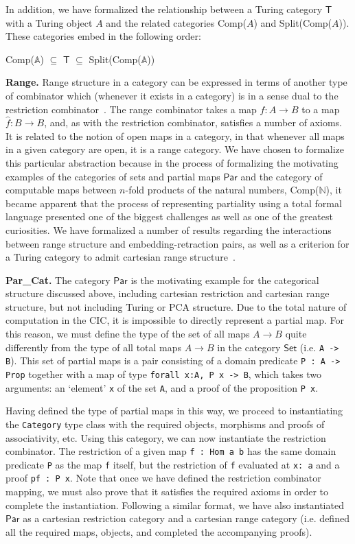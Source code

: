 \documentclass{entcs} \usepackage{entcsmacro}
\begin{document}
In addition, we have formalized the relationship between a Turing category $\mathsf{T}$ with a Turing object $A$ and the related categories Comp($A$) and Split(Comp($A$)). These categories embed in the following order:

\indent Comp($\mathbb{A}$) $\subseteq$ $\mathsf{T}$ $\subseteq$ Split(Comp($\mathbb{A}$))

{\bfseries Range.} Range structure in a category can be expressed in terms of another type of combinator which (whenever it exists in a category) is in a sense dual to the restriction combinator~\cite{RangeI}. The range combinator takes a map $f : A \to B$ to a map $\hat{f} : B \to B$, and, as with the restriction combinator, satisfies a number of axioms. It is related to the notion of open maps in a category, in that whenever all maps in a given category are open, it is a range category. We have chosen to formalize this particular abstraction because in the process of formalizing the motivating examples of the categories of sets and partial maps $\mathsf{Par}$ and the category of computable maps between $n$-fold products of the natural numbers, Comp($\mathbb{N}$), it became apparent that the process of representing partiality using a total formal language presented one of the biggest challenges as well as one of the greatest curiosities. We have formalized a number of results regarding the interactions between range structure and embedding-retraction pairs, as well as a criterion for a Turing category to admit cartesian range structure~\cite{MyThesis}.

{\bfseries Par\_Cat.} The category $\mathsf{Par}$ is the motivating example for the categorical structure discussed above, including cartesian restriction and cartesian range structure, but not including Turing or PCA structure. Due to the total nature of computation in the CIC, it is impossible to directly represent a partial map. For this reason, we must define the type of the set of all maps $A \to B$ quite differently from the type of all total maps $A \to B$ in the category $\mathsf{Set}$ (i.e. {\tt \small A -> B}). This set of partial maps is a pair consisting of a domain predicate {\tt \small P : A -> Prop} together with a map of type {\tt \small forall x:A, P x -> B}, which takes two arguments: an `element' {\tt \small x} of the set {\tt \small A}, and a proof of the proposition {\tt \small P x}. 

Having defined the type of partial maps in this way, we proceed to instantiating the {\tt \small Category} type class with the required objects, morphisms and proofs of associativity, etc. Using this category, we can now instantiate the restriction combinator. The restriction of a given map {\tt \small f : Hom a b} has the same domain predicate {\tt \small P} as the map {\tt \small f} itself, but the restriction of {\tt \small f} evaluated at {\tt \small x: a} and a proof {\tt \small pf : P x}. Note that once we have defined the restriction combinator mapping, we must also prove that it satisfies the required axioms in order to complete the instantiation. Following a similar format, we have also instantiated $\mathsf{Par}$ as a cartesian restriction category and a cartesian range category (i.e. defined all the required maps, objects, and completed the accompanying proofs).
\end{document}

